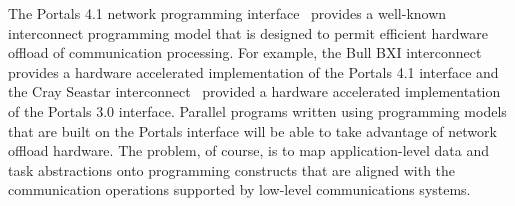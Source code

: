 



%



The Portals 4.1 network programming interface~\cite{portals4} provides a
well-known interconnect programming model that is designed to permit efficient
hardware offload of communication processing. For example, the Bull\othertm{}
BXI\othertm{} interconnect~\cite{bxi} provides a hardware accelerated
implementation of the Portals 4.1 interface and the Cray\othertm{}
Seastar\othertm{} interconnect~\cite{brightwell:micro:06} provided a hardware
accelerated implementation of the Portals 3.0 interface.  Parallel programs
written using programming models that are built on the Portals interface will
be able to take advantage of network offload hardware.  The problem, of course,
is to map application-level data and task abstractions onto programming
constructs that are aligned with the communication operations supported by
low-level communications systems. 

